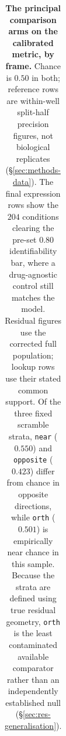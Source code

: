 \begin{table}[htbp]
\begin{tabular}{llr>{\raggedright\arraybackslash}p{}}
\bottomrule
\end{tabular}
\caption{\textbf{The principal comparison arms on the calibrated metric, by frame.} Chance is $0.50$ in
both; reference rows are within-well split-half precision figures, not biological replicates
(\S\ref{sec:methods-data}). The final expression rows show the $204$ conditions clearing the
pre-set $0.80$ identifiability bar, where a drug-agnostic control still matches the model. Residual
figures use the corrected full population; lookup rows use their stated common support. Of the
three fixed scramble strata, \texttt{near} ($0.550$) and \texttt{opposite} ($0.423$) differ from
chance in opposite directions, while \texttt{orth} ($0.501$) is empirically near chance in this
sample. Because the strata are defined using true residual geometry, \texttt{orth} is the least
contaminated available comparator rather than an independently established null
(\S\ref{sec:res-generalisation}).}
\label{tab:allarms}
\end{table}

